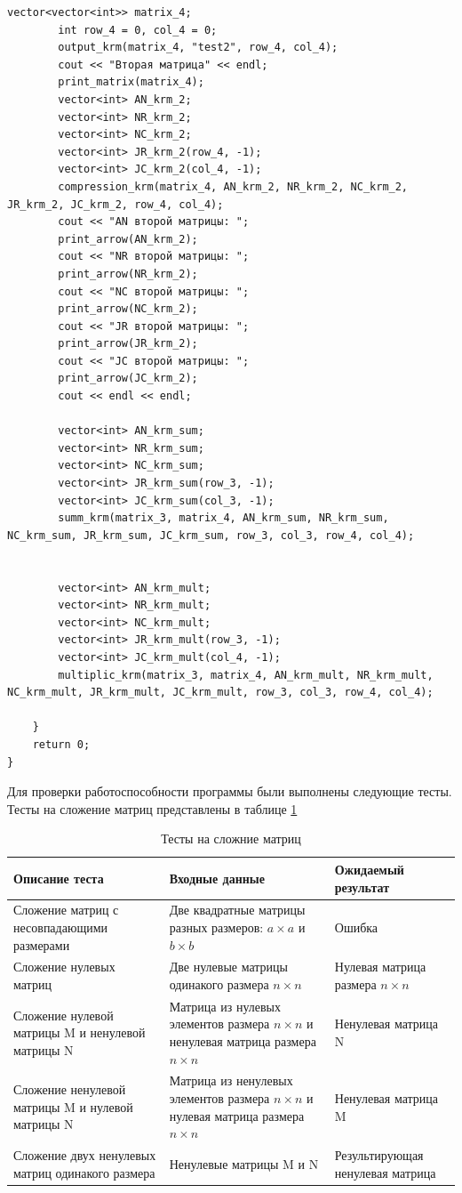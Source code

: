 \documentclass[12pt, a4paper]{article}
\begin{document}
\begin{lstlisting}[caption={Исходный код программы для работы со схемой Дженнингса или с кольцевой схемой},label={lst:label1}]
		vector<vector<int>> matrix_4;
		int row_4 = 0, col_4 = 0;
		output_krm(matrix_4, "test2", row_4, col_4);
		cout << "Вторая матрица" << endl;
		print_matrix(matrix_4);
		vector<int> AN_krm_2;
		vector<int> NR_krm_2;
		vector<int> NC_krm_2;
		vector<int> JR_krm_2(row_4, -1);
		vector<int> JC_krm_2(col_4, -1);
		compression_krm(matrix_4, AN_krm_2, NR_krm_2, NC_krm_2, JR_krm_2, JC_krm_2, row_4, col_4);
		cout << "AN второй матрицы: ";
		print_arrow(AN_krm_2);
		cout << "NR второй матрицы: ";
		print_arrow(NR_krm_2);
		cout << "NC второй матрицы: ";
		print_arrow(NC_krm_2);
		cout << "JR второй матрицы: ";
		print_arrow(JR_krm_2);
		cout << "JC второй матрицы: ";
		print_arrow(JC_krm_2);
		cout << endl << endl;

		vector<int> AN_krm_sum;
		vector<int> NR_krm_sum;
		vector<int> NC_krm_sum;
		vector<int> JR_krm_sum(row_3, -1);
		vector<int> JC_krm_sum(col_3, -1);
		summ_krm(matrix_3, matrix_4, AN_krm_sum, NR_krm_sum, NC_krm_sum, JR_krm_sum, JC_krm_sum, row_3, col_3, row_4, col_4);	
		

		vector<int> AN_krm_mult;
		vector<int> NR_krm_mult;
		vector<int> NC_krm_mult;
		vector<int> JR_krm_mult(row_3, -1);
		vector<int> JC_krm_mult(col_4, -1);
		multiplic_krm(matrix_3, matrix_4, AN_krm_mult, NR_krm_mult, NC_krm_mult, JR_krm_mult, JC_krm_mult, row_3, col_3, row_4, col_4);
		
	}
	return 0;
}
\end{lstlisting}

Для проверки работоспособности программы были выполнены следующие тесты. Тесты на сложение матриц представлены в таблице \ref{tab:my_label}
\begin{table}[h]
\begin{center}
\caption{Тесты на сложние матриц}
\label{tab:my_label}
    \centering
    \begin{tabular}{ | m{5cm} | m{5cm}| m{5cm}|} 
  \hline
  Описание теста & Входные данные & Ожидаемый результат \\ 
  \hline
  Сложение матриц с несовпадающими размерами & Две квадратные матрицы разных размеров: $a \times a$ и $b \times b$ & Ошибка\\
  \hline
  Сложение нулевых матриц & Две нулевые матрицы одинакого размера $n \times n$ & Нулевая матрица размера $n \times n$\\
  \hline
  Сложение нулевой матрицы M и ненулевой матрицы N & Матрица из нулевых элементов размера $n \times n$ и ненулевая матрица размера $n \times n$ & Ненулевая матрица N\\
  \hline
  Сложение ненулевой матрицы M и нулевой матрицы N & Матрица из ненулевых элементов размера $n \times n$ и нулевая матрица размера $n \times n$ & Ненулевая матрица M\\
  \hline
  Сложение двух ненулевых матриц одинакого размера & Ненулевые матрицы M и N & Результирующая ненулевая матрица\\
  \hline
\end{tabular}
\end{center}
\end{table}
\end{document}

